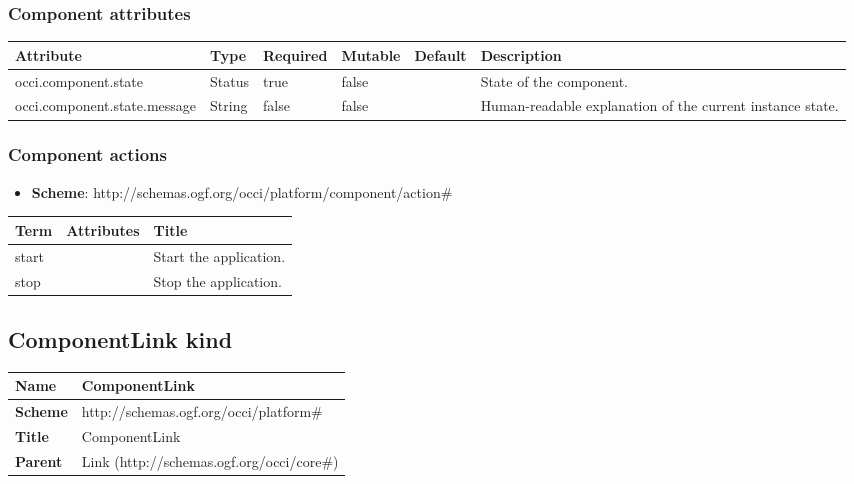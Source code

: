 \documentclass{article}
\begin{document}
\subsubsection{Component attributes}
\begin{tabularx}{\textwidth}{|l|l|p{1.4cm}|p{1.3cm}|l|X|}
  \hline
  \textbf{Attribute} & \textbf{Type} & \textbf{Required} & \textbf{Mutable} & \textbf{Default} & \textbf{Description} \\
  \hline  
  occi.component.state & Status & true & false &  & State of the component. \\
  \hline
  occi.component.state.message & String & false & false &  & Human-readable explanation of the current instance state. \\
  \hline
\end{tabularx}

\subsubsection{Component actions}
\begin{itemize}
	\item \textbf{Scheme}: http://schemas.ogf.org/occi/platform/component/action\#
\end{itemize}
\begin{tabularx}{\textwidth}{|l|l|X|}
  \hline
  \textbf{Term}  & \textbf{Attributes} & \textbf{Title} \\
  \hline  
  start & & Start the application. \\
  \hline
  stop & & Stop the application. \\
  \hline
\end{tabularx}

\subsection{ComponentLink kind}
\begin{center}
\begin{tabular}{|l|l|}
  \hline
  \textbf{Name} & ComponentLink \\
  \hline  
  \textbf{Scheme} & http://schemas.ogf.org/occi/platform\# \\
  \hline
  \textbf{Title} & ComponentLink \\
  \hline
  \textbf{Parent} & Link (http://schemas.ogf.org/occi/core\#) \\
  \hline
\end{tabular}
\end{center}
\end{document}
